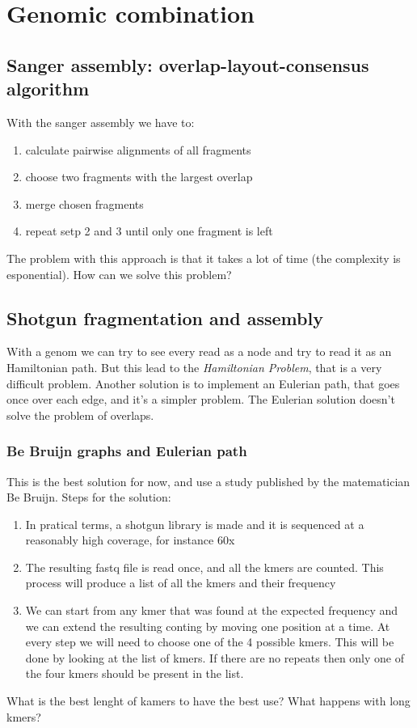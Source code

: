 \section{Genomic combination}

\subsection{Sanger assembly: overlap-layout-consensus algorithm}

With the sanger assembly we have to:
\begin{enumerate}
  \item calculate pairwise alignments of all fragments
  \item choose two fragments with the largest overlap
  \item merge chosen fragments
  \item repeat setp 2 and 3 until only one fragment is left
\end{enumerate}

The problem with this approach is that it takes a lot of time (the complexity
is esponential). How can we solve this problem?

\subsection{Shotgun fragmentation and assembly}
With a genom we can try to see every read as a node and try to read it as an
Hamiltonian path. But this lead to the \textit{Hamiltonian Problem}, that is a
very difficult problem.
Another solution is to implement an Eulerian path, that goes once over each
edge, and it's a simpler problem.
The Eulerian solution doesn't solve the problem of overlaps.

\subsubsection{Be Bruijn graphs and Eulerian path}
This is the best solution for now, and use a study published by the
matematician Be Bruijn.
Steps for the solution:
\begin{enumerate}
  \item In pratical terms, a shotgun library is made and it is sequenced at a
reasonably high coverage, for instance 60x
  \item The resulting fastq file is read once, and all the kmers are counted.
This process will produce a list of all the kmers and their frequency
  \item We can start from any kmer that was found at the expected frequency and
we can extend the resulting conting by moving one position at a time. At every
step we will need to choose one of the 4 possible kmers. This will be done by
looking at the list of kmers. If there are no repeats then only one of the four
kmers should be present in the list.
\end{enumerate}

What is the best lenght of kamers to have the best use? What happens with long
kmers?
